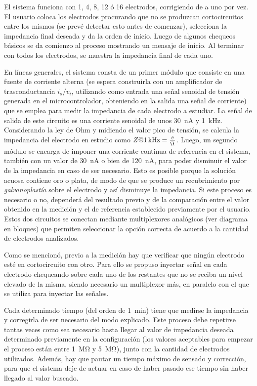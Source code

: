 El sistema funciona con 1, 4, 8, 12 ó 16 electrodos, corrigiendo de a uno por vez. El usuario coloca los electrodos procurando que no se produzcan cortocircuitos entre los mismos (se prevé detectar esto antes de comenzar), selecciona la impedancia final deseada y da la orden de inicio. Luego de algunos chequeos básicos se da comienzo al proceso mostrando un mensaje de inicio. Al terminar con todos los electrodos, se muestra la impedancia final de cada uno. 

En líneas generales, el sistema consta de un primer módulo que consiste en una fuente de corriente alterna (se espera construirla con un amplificador de trasconductancia $i_o/v_i$, utilizando como entrada una señal senoidal de tensión generada en el microcontrolador, obteniendo en la salida una señal de corriente) que se emplea para medir la impedancia de cada electrodo a estudiar. La señal de salida de este circuito es una corriente senoidal de unos \SI{30}{\nano\ampere} y \SI{1}{\kilo\hertz}. Considerando la ley de Ohm y midiendo el valor pico de tensión, se calcula la impedancia del electrodo en estudio como $Z@\SI{1}{\kilo\hertz} = \frac{\hat{v}}{\hat{\i}}$. Luego, un segundo módulo se encarga de imponer una corriente continua de referencia en el sistema, también con un valor de \SI{30}{\nano\ampere} o bien de \SI{120}{\nano\ampere}, para poder disminuir el valor de la impedancia en caso de ser necesario. Esto es posible porque la solución acuosa contiene oro o plata, de modo de que se produce un recubrimiento por \emph{galvanoplastía} sobre el electrodo y así disminuye la impedancia. Si este proceso es necesario o no, dependerá del resultado previo y de la comparación entre el valor obtenido en la medición y el de referencia establecido previamente por el usuario. Estos dos circuitos se conectan mediante multiplexores analógicos (ver diagrama en bloques) que permiten seleccionar la opción correcta de acuerdo a la cantidad de electrodos analizados. 

Como se mencionó, previo a la medición hay que verificar que ningún electrodo esté en cortocircuito con otro. Para ello se propuso inyectar señal en cada electrodo chequeando sobre cada uno de los restantes que no se reciba un nivel elevado de la misma, siendo necesario un multiplexor más, en paralelo con el que se utiliza para inyectar las señales.

Cada determinado tiempo (del orden de \SI{1}{\minute}) tiene que medirse la impedancia y corregirla de ser necesario del modo explicado. Este proceso debe repetirse tantas veces como sea necesario hasta llegar al valor de impedancia deseada determinado previamente en la configuración (los valores aceptables para empezar el proceso están entre \SI{1}{\mega\ohm} y \SI{5}{\mega\ohm}), junto con la cantidad de electrodos utilizados. Además, hay que pautar un tiempo máximo de sensado y corrección, para que el sistema deje de actuar en caso de haber pasado ese tiempo sin haber llegado al valor buscado.



